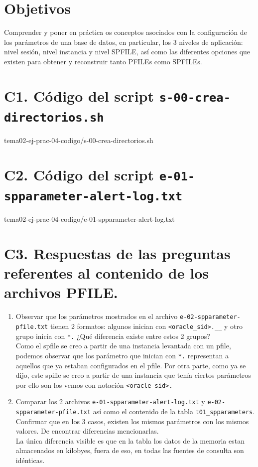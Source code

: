 \documentclass{article}
\begin{document}
\section*{Objetivos}
Comprender y poner en práctica os conceptos asociados con la configuración de 
los parámetros de una base de datos, en particular, los 3 niveles de
aplicación: nivel sesión, nivel instancia y nivel SPFILE, así como las 
diferentes opciones que existen para obtener y reconstruir tanto PFILEs como 
SPFILEs.

\section*{C1. Código del script \texttt{s-00-crea-directorios.sh}}

    {tema02-ej-prac-04-codigo/s-00-crea-directorios.sh}

\section*{C2. Código del script \texttt{e-01-spparameter-alert-log.txt}}

    {tema02-ej-prac-04-codigo/e-01-spparameter-alert-log.txt}
\section*{C3. Respuestas de las preguntas referentes al contenido de 
los archivos PFILE.}
\begin{enumerate}
    \item Observar que los parámetros mostrados en el archivo 
    \texttt{e-02-spparameter-pfile.txt} tienen 2 formatos: algunos inician con
    \texttt{<oracle\_sid>.\_\_} y otro grupo inicia con \texttt{*.} ¿Qué 
    diferencia existe entre estos 2 grupos?\\
    
    Como el spfile se creo a partir de una instancia levantada con un pfile,
    podemos observar que los parámetro que inician con \texttt{*.} representan
    a aquellos que ya estaban configurados en el pfile. Por otra parte, como
    ya se dijo, este spifle se creo a partir de una instancia que tenía ciertos
    parámetros por ello son los vemos con notación \texttt{<oracle\_sid>.\_\_}
    \item Comparar los 2 archivos \texttt{e-01-spparameter-alert-log.txt} y 
    \texttt{e-02-spparameter-pfile.txt} así como el contenido de la tabla
    \texttt{t01\_spparameters}. Confirmar que en los 3 casos, existen los mismos 
    parámetros con los mismos valores. De encontrar diferencias mencionarlas.\\

    La única diferencia visible es que en la tabla los datos de la memoria estan
    almacenados en kilobyes, fuera de eso, en todas las fuentes de consulta 
    son idénticas.
\end{enumerate}
\newpage
\end{document}
